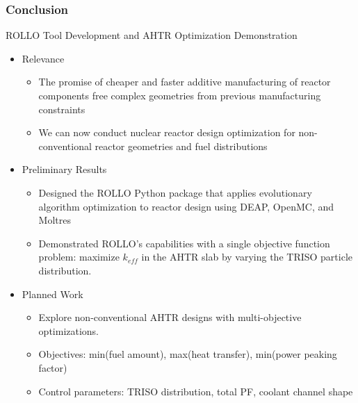 \begin{frame}
    \frametitle{Conclusion}
    ROLLO Tool Development and AHTR 
    Optimization Demonstration
    \begin{itemize}
        \item Relevance
        \begin{itemize}
            \item The promise of cheaper and faster additive manufacturing of reactor 
            components free complex geometries from previous manufacturing constraints
            \item We can now conduct nuclear reactor design optimization for 
            non-conventional reactor geometries and fuel distributions
        \end{itemize}
        \item Preliminary Results
        \begin{itemize}
            \item Designed the ROLLO Python package that applies 
            evolutionary algorithm optimization to reactor design using 
            DEAP, OpenMC, and Moltres
            \item Demonstrated ROLLO's capabilities with a single objective function 
            problem: maximize $k_{eff}$ in the AHTR slab by varying the 
            TRISO particle distribution. 
        \end{itemize} 
        \item Planned Work
        \begin{itemize}
            \item Explore non-conventional AHTR designs with multi-objective optimizations. 
            \item Objectives: min(fuel amount), max(heat transfer), min(power peaking factor) 
            \item Control parameters: TRISO distribution, total PF, coolant channel shape 
        \end{itemize}
    \end{itemize}
    \vspace{-0.4cm}
    \begin{figure}[]
        \centering
    \end{figure}
\end{frame}